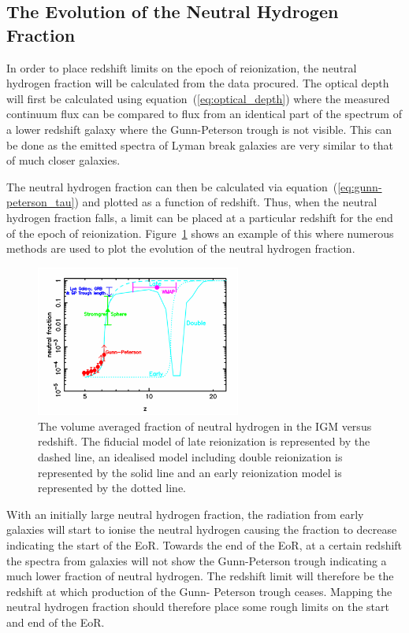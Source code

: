 \subsection{The Evolution of the Neutral Hydrogen Fraction} %
\label{sec:the_evolution_of_the_neutral_hydrogen_fraction}
	In order to place redshift limits on the epoch of reionization, the neutral hydrogen fraction will be calculated from the data procured. The optical depth will first be calculated using equation~(\ref{eq:optical_depth}) where the measured continuum flux can be compared to flux from an identical part of the spectrum of a lower redshift galaxy where the Gunn-Peterson trough is not visible. This can be done as the emitted spectra of Lyman break galaxies are very similar to that of much closer galaxies.

	The neutral hydrogen fraction can then be calculated via equation~(\ref{eq:gunn-peterson_tau}) and plotted as a function of redshift. Thus, when the neutral hydrogen fraction falls, a limit can be placed at a particular redshift for the end of the epoch of reionization. Figure~\ref{fig:Evolution_Xh1} shows an example of this where numerous methods are used to plot the evolution of the neutral hydrogen fraction\cite{Fanetal}.
	\begin{figure}[H]
		\centering
		\includegraphics[width=0.6\textwidth]{../Images/Evolution_Xh1.png}
		\caption{The volume averaged fraction of neutral hydrogen in the IGM versus redshift. The fiducial model of late reionization is represented by the dashed line, an idealised model including double reionization is represented by the solid line and an early reionization model is represented by the dotted line.}\label{fig:Evolution_Xh1}
	\end{figure}

	With an initially large neutral hydrogen fraction, the radiation from early galaxies will start to ionise the neutral hydrogen causing the fraction to decrease indicating the start of the EoR. Towards the end of the EoR, at a certain redshift the spectra from galaxies will not show the Gunn-Peterson trough indicating a much lower fraction of neutral hydrogen. The redshift limit will therefore be the redshift at which production of the Gunn- Peterson trough ceases. Mapping the neutral hydrogen fraction should therefore place some rough limits on the start and end of the EoR.

